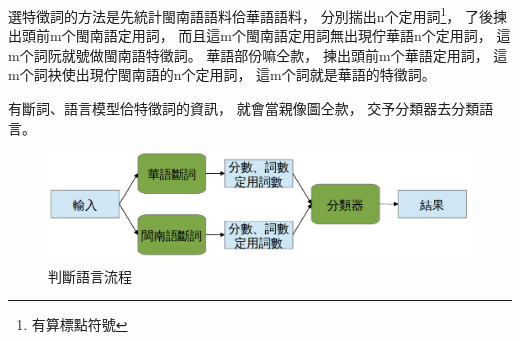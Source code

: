 選特徵詞的方法是先統計閩南語語料佮華語語料，
分別揣出n个定用詞\footnote{有算標點符號}，
了後揀出頭前m个閩南語定用詞，
而且這m个閩南語定用詞無出現佇華語n个定用詞，
這m个詞阮就號做閩南語特徵詞。
華語部份嘛仝款，
揀出頭前m个華語定用詞，
這m个詞袂使出現佇閩南語的n个定用詞，
這m个詞就是華語的特徵詞。

有斷詞、語言模型佮特徵詞的資訊，
就會當親像圖\label{圖：判斷語言架構}仝款，
交予分類器去分類語言。


\begin{figure}
\centerline{\includegraphics[keepaspectratio,width=40em]{圖/判斷語言架構}}
\caption{判斷語言流程}
\label{圖：判斷語言架構}
\end{figure}

